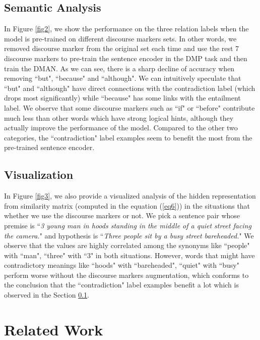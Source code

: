 \documentclass[11pt,letterpaper]{article}
\begin{document}
\subsection{Semantic Analysis}
\label{sec5.5}
In Figure \ref{fig2}, we show the performance on the three relation labels when the model is pre-trained on different discourse markers sets. In other words, we removed discourse marker from the original set each time and use the rest 7 discourse markers to pre-train the sentence encoder in the DMP task and then train the DMAN. As we can see, there is a sharp decline of accuracy when removing ``but", ``because" and ``although". We can intuitively speculate that ``but" and ``although" have direct connections with the contradiction label (which drops most significantly) while ``because" has some links with the entailment label. We observe that some discourse markers such as ``if" or ``before" contribute much less than other words which have strong logical hints, although they actually improve the performance of the model. Compared to the other two categories, the ``contradiction" label examples seem to benefit the most from the pre-trained sentence encoder.




\subsection{Visualization}
 In Figure \ref{fig3}, we also provide a visualized analysis of the hidden representation from similarity matrix  (computed in the equation (\ref{eq6})) in the situations that whether we use the discourse markers or not. We pick a sentence pair whose premise is ``\emph{3 young man in hoods standing in the middle of a quiet street facing the camera.}" and hypothesis is ``\emph{Three people sit by a busy street bareheaded.}" We observe that the values are highly correlated among the synonyms like ``people" with ``man", ``three" with ``3" in both situations. However, words that might have contradictory meanings like ``hoods" with ``bareheaded", ``quiet" with ``busy" perform worse without the discourse markers augmentation, which conforms to the conclusion that the ``contradiction" label examples benefit a lot which is observed in the Section \ref{sec5.5}.




\section{Related Work}
\end{document}
